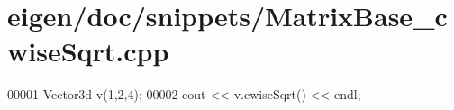 \hypertarget{eigen_2doc_2snippets_2_matrix_base__cwise_sqrt_8cpp_source}{}\section{eigen/doc/snippets/\+Matrix\+Base\+\_\+cwise\+Sqrt.cpp}
\label{eigen_2doc_2snippets_2_matrix_base__cwise_sqrt_8cpp_source}

\begin{DoxyCode}
00001 Vector3d v(1,2,4);
00002 cout << v.cwiseSqrt() << endl;
\end{DoxyCode}
